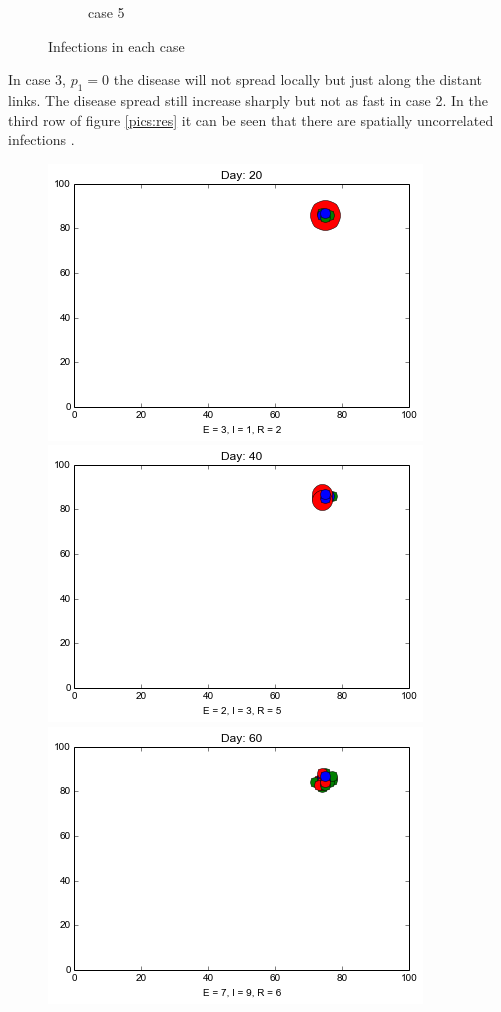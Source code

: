 \begin{figure}[h]
\begin{subfigure}[b]{0.3\textwidth}
        \caption{case 5}
        \label{e}
    \end{subfigure}
    \caption{Infections in each case}\label{fig5.4}
\end{figure}

In case 3, $p_1 = 0$ the disease will not spread locally but just along the distant links. The disease spread still increase sharply but not as fast in case 2. In the third row of figure \ref{pics:res} it can be seen that there are spatially uncorrelated infections . 
\begin{figure}[h]
\centering
\includegraphics[scale=0.28]{images/1t20.png} \quad
\includegraphics[scale=0.28]{images/1t40.png} \quad
\includegraphics[scale=0.28]{images/1t60.png} \quad

\end{figure}
